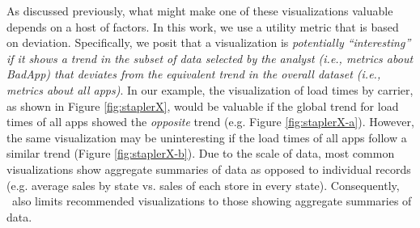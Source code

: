 As discussed previously, what might make one of these visualizations valuable depends on a host of factors.
In this work, we use a utility metric that is based on deviation.
Specifically, we posit that a visualization is {\em potentially ``interesting'' if it shows 
a trend in the subset of data selected by the analyst
(i.e., metrics about BadApp)
that deviates from the equivalent trend in the overall dataset (i.e., metrics
about all apps)}.
In our example, the visualization of load times by carrier, as shown in Figure
\ref{fig:staplerX}, would be valuable if the global trend for load times of all
apps showed the {\it opposite} trend (e.g. Figure \ref{fig:staplerX-a}).
However, the same visualization may be uninteresting if the load times of all apps
follow a similar trend (Figure \ref{fig:staplerX-b}).
Due to the scale of data, most common visualizations show aggregate summaries of data
as opposed to individual records (e.g. average sales by state vs. sales of each store 
in every state).
Consequently, \SeeDB\ also limits recommended visualizations to those showing aggregate 
summaries of data.




